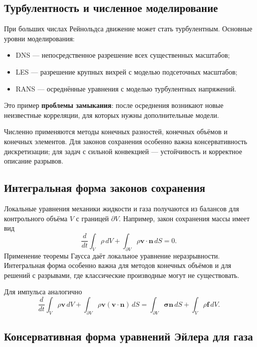 \subsection{Турбулентность и численное моделирование}

При больших числах Рейнольдса движение может стать турбулентным. Основные
уровни моделирования:
\begin{itemize}
    \item DNS --- непосредственное разрешение всех существенных масштабов;
    \item LES --- разрешение крупных вихрей с моделью подсеточных масштабов;
    \item RANS --- осреднённые уравнения с моделью турбулентных напряжений.
\end{itemize}
Это пример \textbf{проблемы замыкания}: после осреднения возникают новые
неизвестные корреляции, для которых нужны дополнительные модели.

Численно применяются методы конечных разностей, конечных объёмов и конечных
элементов. Для законов сохранения особенно важна консервативность
дискретизации; для задач с сильной конвекцией --- устойчивость и корректное
описание разрывов.


\subsection{Интегральная форма законов сохранения}

Локальные уравнения механики жидкости и газа получаются из балансов для
контрольного объёма $V$ с границей $\partial V$. Например, закон сохранения массы
имеет вид
\[
    \boxed{
    \frac{d}{dt}\int_V\rho\,dV
    +\int_{\partial V}\rho\mathbf v\cdot\mathbf n\,dS=0.
    }
\]
Применение теоремы Гаусса даёт локальное уравнение неразрывности. Интегральная
форма особенно важна для методов конечных объёмов и для решений с разрывами,
где классические производные могут не существовать.

Для импульса аналогично
\[
    \frac{d}{dt}\int_V\rho\mathbf v\,dV
    +\int_{\partial V}\rho\mathbf v(\mathbf v\cdot\mathbf n)\,dS
    =\int_{\partial V}\boldsymbol\sigma\mathbf n\,dS
     +\int_V\rho\mathbf f\,dV.
\]

\subsection{Консервативная форма уравнений Эйлера для газа}

